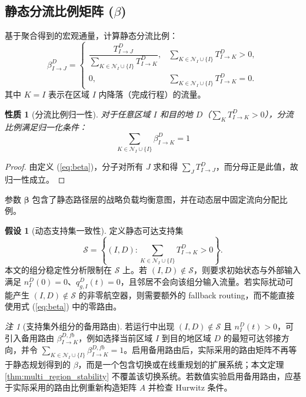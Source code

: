 \documentclass[a4paper,12pt]{article}
\theoremstyle{plain}
\newtheorem{property}[theorem]{性质}
\theoremstyle{definition}
\newtheorem{assumption}[theorem]{假设}
\theoremstyle{remark}
\newtheorem{remark}[theorem]{注}
\begin{document}
\subsection{静态分流比例矩阵 ($\beta$)}
基于聚合得到的宏观通量，计算静态分流比例：
\begin{equation} \label{eq:beta}
    \beta_{I \to J}^D =
    \begin{cases}
    \dfrac{T_{I \to J}^D}{\sum_{K \in \mathcal{N}_I \cup \{I\}} T_{I \to K}^D}, & \sum_{K \in \mathcal{N}_I \cup \{I\}} T_{I \to K}^D>0,\\[1.2em]
    0, & \sum_{K \in \mathcal{N}_I \cup \{I\}} T_{I \to K}^D=0 .
    \end{cases}
\end{equation}
其中 $K = I$ 表示在区域 $I$ 内降落（完成行程）的流量。

\begin{property}[分流比例归一性]\label{prop:beta_normalization}
对于任意区域 $I$ 和目的地 $D$（$\sum_K T_{I \to K}^D > 0$），分流比例满足归一化条件：
\begin{equation}
    \sum_{K \in \mathcal{N}_I \cup \{I\}} \beta_{I \to K}^D = 1
\end{equation}
\end{property}

\begin{proof}
由定义 (\ref{eq:beta})，分子对所有 $J$ 求和得 $\sum_J T_{I \to J}^D$，而分母正是此值，故归一性成立。
\end{proof}

参数 $\bm{\beta}$ 包含了静态路径层的战略负载均衡意图，并在动态层中固定流向分配比例。

\begin{assumption}[动态支持集一致性]\label{asm:support_consistency}
定义静态可达支持集
\begin{equation}\label{eq:support_set}
    \mathcal S=\left\{(I,D):\sum_{K\in\mathcal N_I\cup\{I\}}T_{I\to K}^D>0\right\}.
\end{equation}
本文的组分稳定性分析限制在 $\mathcal S$ 上。若 $(I,D)\notin\mathcal S$，则要求初始状态与外部输入满足 $n_I^D(0)=0$、$q_{g,I}^D(t)=0$，且邻居不会向该组分输入流量。若实际扰动可能产生 $(I,D)\notin\mathcal S$ 的非零航空器，则需要额外的 fallback routing，而不能直接使用式 (\ref{eq:beta}) 中的零路由。
\end{assumption}

\begin{remark}[支持集外组分的备用路由]\label{rem:fallback_routing}
若运行中出现 $(I,D)\notin\mathcal S$ 且 $n_I^D(t)>0$，可引入备用路由 $\beta_{I\to K}^{D,fb}$，例如选择当前区域 $I$ 到目的地区域 $D$ 的最短可达邻接方向，并令 $\sum_{K\in\mathcal N_I\cup\{I\}}\beta_{I\to K}^{D,fb}=1$。启用备用路由后，实际采用的路由矩阵不再等于静态规划得到的 $\beta$，而是一个包含切换或在线重规划的扩展系统；本文定理 \ref{thm:multi_region_stability} 不覆盖该切换系统。若数值实验启用备用路由，应基于实际采用的路由比例重新构造矩阵 $A$ 并检查 Hurwitz 条件。
\end{remark}
\end{document}
